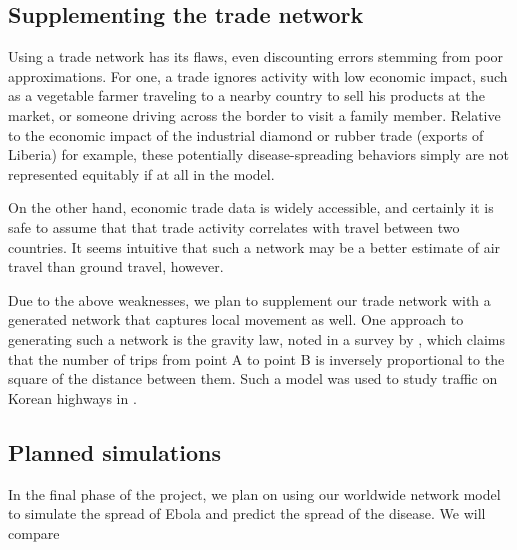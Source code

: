 \documentclass[10pt, journal,onecolumn]{IEEEtran}
\begin{document}
\subsection*{\textbf{Supplementing the trade network}}

Using a trade network has its flaws, even discounting errors stemming from poor approximations.
For one, a trade ignores activity with low economic impact, such as
a vegetable farmer traveling to a nearby country to sell his products at the market, or someone
driving across the border to visit a family member. Relative to the economic impact of the industrial
diamond or rubber trade (exports of Liberia) for example, these potentially disease-spreading behaviors
simply are not represented equitably if at all in the model.

On the other hand, economic trade data is widely accessible, and certainly it is safe to assume that
that trade activity correlates with travel between two countries. It seems intuitive that
such a network may be a better estimate of air travel than ground travel, however.

Due to the above weaknesses, we plan to supplement our trade network with a generated network that
captures local movement as well. One approach to generating such a network is the gravity law,
noted in a survey by \cite{barthelemy2011spatial}, which claims that the number of trips from
point A to point B is inversely proportional to the square of the distance between them.
Such a model was used to study traffic on Korean highways in \cite{jung2008gravity}.

\subsection*{\textbf{Planned simulations}}

In the final phase of the project, we plan on using our worldwide network model to simulate the
spread of Ebola and predict the spread of the disease. We will compare 







\end{document}
